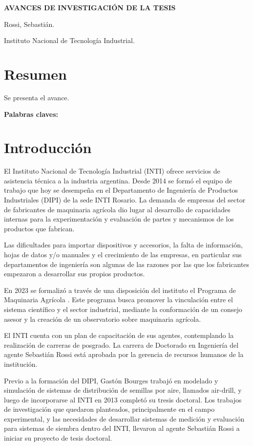 \documentclass[12pt]{article}
\begin{document}
    \textbf{AVANCES DE INVESTIGACIÓN DE LA TESIS}
    
    Rossi, Sebastián.
    
    Instituto Nacional de Tecnología Industrial.
    
    \section*{Resumen}
    
    Se presenta el avance.
    
    \textbf{Palabras claves:} 
        
    \section{Introducción}
    
    El Instituto Nacional de Tecnología Industrial (INTI) \cite{inti-web} ofrece servicios de asistencia técnica a la industria argentina. Desde 2014 se formó el equipo de trabajo que hoy se desempeña en el Departamento de Ingeniería de Productos Industriales (DIPI) de la sede INTI Rosario. La demanda de empresas del sector de fabricantes de maquinaria agrícola dio lugar al desarrollo de capacidades internas para la experimentación y evaluación de partes y mecanismos de los productos que fabrican. 
    
    Las dificultades para importar dispositivos y accesorios, la falta de información, hojas de datos y/o manuales y el crecimiento de las empresas, en particular sus departamentos de ingeniería son algunas de las razones por las que los fabricantes empezaron a desarrollar sus propios productos.
    
    En 2023 se formalizó a través de una disposición del instituto el Programa de Maquinaria Agrícola \cite{programa-maq-agricola-web}. Este programa busca promover la vinculación entre el sistema científico y el sector industrial, mediante la conformación de un consejo asesor y la creación de un observatorio sobre maquinaria agrícola.
    
    El INTI cuenta con un plan de capacitación de sus agentes, contemplando la realización de carreras de posgrado. La carrera de Doctorado en Ingeniería del agente Sebastián Rossi está aprobada por la gerencia de recursos humanos de la institución.
    
    Previo a la formación del DIPI, Gastón Bourges trabajó en modelado y simulación de sistemas de distribución de semillas por aire, llamados air-drill, y luego de incorporarse al INTI en 2013 completó su tresis doctoral. Los trabajos de investigación que quedaron planteados, principalmente en el campo experimental, y las necesidades de desarrollar sistemas de medición y evaluación para sistemas de siembra dentro del INTI, llevaron al agente Sebastián Rossi a iniciar su proyecto de tesis doctoral.
    
\end{document}
